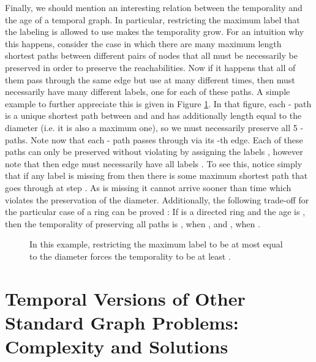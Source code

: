 \documentclass[oribibl, 11pt]{llncs}
\begin{document}
Finally, we should mention an interesting relation between the temporality and the age of a temporal graph. In particular, restricting the maximum label that the labeling is allowed to use makes the temporality grow. For an intuition why this happens, consider the case in which there are many maximum length shortest paths between different pairs of nodes that all must be necessarily be preserved in order to preserve the reachabilities. Now if it happens that all of them pass through the same edge  but use  at many different times, then  must necessarily have many different labels, one for each of these paths. A simple example to further appreciate this is given in Figure \ref{fig:diam}. In that figure, each - path is a unique shortest path between  and  and has additionally length equal to the diameter (i.e. it is also a maximum one), so we must necessarily preserve all 5 - paths. Note now that each - path passes through  via its -th edge. Each of these paths can only be preserved without violating  by assigning the labels , however note that then edge  must necessarily have all labels . To see this, notice simply that if any label  is missing from  then there is some maximum shortest path that goes through  at step . As  is missing it cannot arrive sooner than time  which violates the preservation of the diameter. Additionally, the following trade-off for the particular case of a ring can be proved \cite{MMCS13}: If  is a directed ring and the age is , then the temporality of preserving all paths is , when , and , when . 

\begin{figure}[!hbtp]
\caption{In this example, restricting the maximum label to be at most equal to the diameter  forces the temporality to be at least .} \label{fig:diam}
\end{figure}

\section{Temporal Versions of Other Standard Graph Problems: Complexity and Solutions}
\label{sec:matching}
\end{document}
